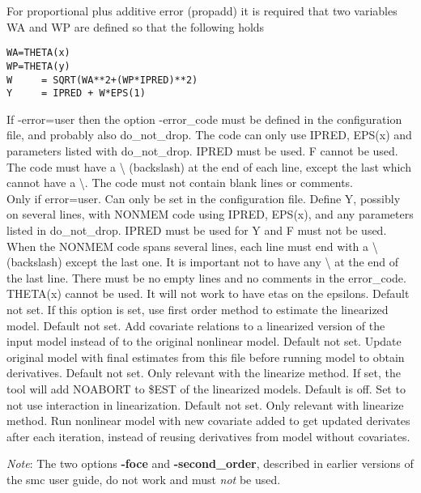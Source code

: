 \begin{optionlist}
For proportional plus additive error (propadd) it is required that two variables WA and WP are defined so that the following holds 
\begin{verbatim}
WA=THETA(x)
WP=THETA(y)
W     = SQRT(WA**2+(WP*IPRED)**2)
Y     = IPRED + W*EPS(1)
\end{verbatim}
If -error=user then the option -error\_code must be defined in the configuration file, and probably also do\_not\_drop. The code can only use IPRED, EPS(x) and parameters listed with do\_not\_drop. IPRED must be used. F cannot be used. The code must have a \textbackslash{} (backslash) at the end of each line, except the last which cannot have a \textbackslash{}. The code must not contain blank lines or comments.  \\
\nextopt
{}
Only if error=user. Can only be set in the configuration file. Define Y, possibly on several lines, with NONMEM code using IPRED, EPS(x), and any parameters listed in do\_not\_drop. IPRED must be used for Y and F must not be used. When the NONMEM code spans several lines, each line must end with a \textbackslash{} (backslash) except the last one. It is important not to have any \textbackslash{}  at the end of the last line. There must be no empty lines and no comments in the error\_code. THETA(x) cannot be used. It will not work to have etas on the epsilons. 
\nextopt
{}
Default not set. If this option is set, use first order method to estimate the linearized model.
\nextopt
{}
Default not set. Add covariate relations to a linearized version of the input model instead of to the original nonlinear model.
\nextopt
{}
Default not set. Update original model with final estimates from this file before running model to obtain derivatives. 
\nextopt
{}
Default not set. Only relevant with the linearize method. If set, the tool will add NOABORT to \$EST of the linearized models. 
\nextopt
{}
Default is off. Set to not use interaction in linearization.
\nextopt
{}
Default not set. Only relevant with linearize method. Run nonlinear model with new covariate added to get updated derivates after each iteration, instead of reusing derivatives from model without covariates.
\nextopt
\end{optionlist}
\emph{Note}: The two options \textbf{-foce} and \textbf{-second\_order}, described in earlier versions of the smc user guide, do not work and must \emph{not} be used.

